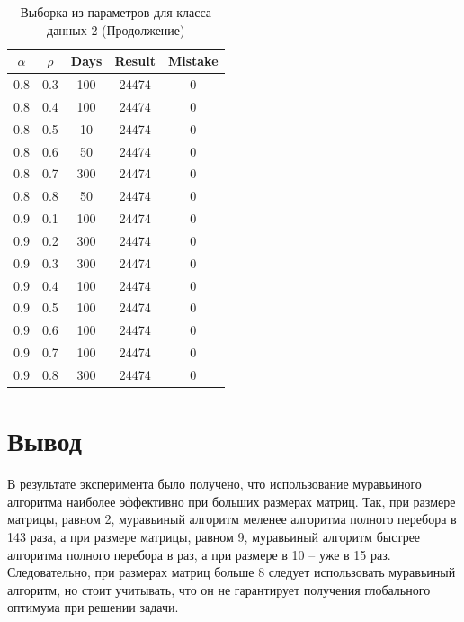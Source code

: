 \begin{center}
	\captionsetup{justification=raggedright,singlelinecheck=off}
	\begin{longtable}[c]{|c|c|c|c|c|}
		\caption{Выборка из параметров для класса данных 2 (Продолжение)\label{tbl:table_kd2-3}}\\ \hline
		$\alpha$ & $\rho$ & Days & Result & Mistake \\ \hline
		0.8 & 0.3 & 100 &   24474 &    0 \\
		0.8 & 0.4 & 100 &   24474 &    0 \\
		0.8 & 0.5 & 10 &   24474 &    0 \\
		0.8 & 0.6 & 50 &   24474 &    0 \\
		0.8 & 0.7 & 300 &   24474 &    0 \\
		0.8 & 0.8 & 50 &  24474 &    0 \\ \hline
		0.9 & 0.1 & 100 &   24474 &    0 \\
		0.9 & 0.2 & 300 &   24474 &    0 \\
		0.9 & 0.3 & 300 &   24474 &    0 \\
		0.9 & 0.4 & 100 &   24474 &    0 \\
		0.9 & 0.5 & 100 &   24474 &    0 \\
		0.9 & 0.6 & 100 &   24474 &    0 \\
		0.9 & 0.7 & 100 &   24474 &    0 \\
		0.9 & 0.8 & 300 &  24474 &    0 \\ \hline
	\end{longtable}
\end{center}

\section{Вывод}

В результате эксперимента было получено, что использование муравьиного алгоритма наиболее эффективно при больших размерах матриц. Так, при размере матрицы, равном 2, муравьиный алгоритм меленее алгоритма полного перебора в 143 раза, а при размере матрицы, равном 9, муравьиный алгоритм быстрее алгоритма полного перебора в раз, а при размере в 10 -- уже в 15 раз. Следовательно, при размерах матриц больше 8 следует использовать муравьиный алгоритм, но стоит учитывать, что он не гарантирует получения глобального оптимума при решении задачи.

